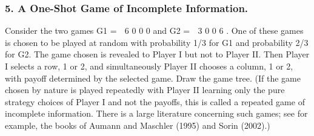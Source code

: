 \begin{framed}
\begin{itemize}
\subsubsection{5. A One-Shot Game of Incomplete Information.} Consider the two games
G1 =
 6 0
0 0
and G2 =
 3 0
0 6
. One of these games is chosen to be played at random
with probability 1/3 for G1 and probability 2/3 for G2. The game chosen is revealed to
Player I but not to Player II. Then Player I selects a row, 1 or 2, and simultaneously
Player II chooses a column, 1 or 2, with payoff determined by the selected game. Draw
the game tree. (If the game chosen by nature is played repeatedly with Player II learning
only the pure strategy choices of Player I and not the payoffs, this is called a repeated
game of incomplete information. There is a large literature concerning such games; see for
example, the books of Aumann and Maschler (1995) and Sorin (2002).)

\end{itemize}
\end{framed}
